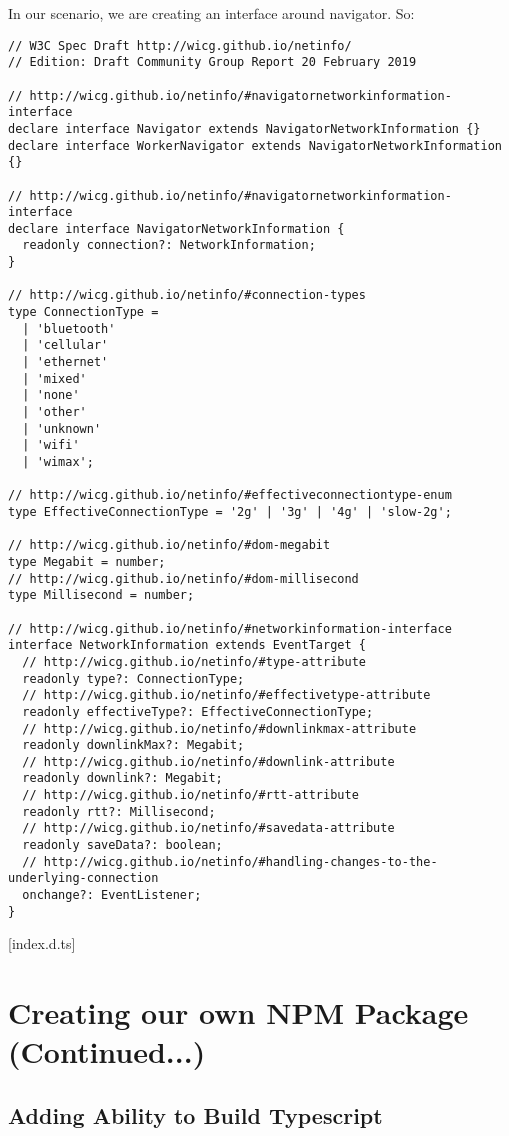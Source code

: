 In our scenario, we are creating an interface around navigator. So: 
\begin{lstlisting}[caption=index.d.ts]
// W3C Spec Draft http://wicg.github.io/netinfo/
// Edition: Draft Community Group Report 20 February 2019

// http://wicg.github.io/netinfo/#navigatornetworkinformation-interface
declare interface Navigator extends NavigatorNetworkInformation {}
declare interface WorkerNavigator extends NavigatorNetworkInformation {}

// http://wicg.github.io/netinfo/#navigatornetworkinformation-interface
declare interface NavigatorNetworkInformation {
  readonly connection?: NetworkInformation;
}

// http://wicg.github.io/netinfo/#connection-types
type ConnectionType =
  | 'bluetooth'
  | 'cellular'
  | 'ethernet'
  | 'mixed'
  | 'none'
  | 'other'
  | 'unknown'
  | 'wifi'
  | 'wimax';

// http://wicg.github.io/netinfo/#effectiveconnectiontype-enum
type EffectiveConnectionType = '2g' | '3g' | '4g' | 'slow-2g';

// http://wicg.github.io/netinfo/#dom-megabit
type Megabit = number;
// http://wicg.github.io/netinfo/#dom-millisecond
type Millisecond = number;

// http://wicg.github.io/netinfo/#networkinformation-interface
interface NetworkInformation extends EventTarget {
  // http://wicg.github.io/netinfo/#type-attribute
  readonly type?: ConnectionType;
  // http://wicg.github.io/netinfo/#effectivetype-attribute
  readonly effectiveType?: EffectiveConnectionType;
  // http://wicg.github.io/netinfo/#downlinkmax-attribute
  readonly downlinkMax?: Megabit;
  // http://wicg.github.io/netinfo/#downlink-attribute
  readonly downlink?: Megabit;
  // http://wicg.github.io/netinfo/#rtt-attribute
  readonly rtt?: Millisecond;
  // http://wicg.github.io/netinfo/#savedata-attribute
  readonly saveData?: boolean;
  // http://wicg.github.io/netinfo/#handling-changes-to-the-underlying-connection
  onchange?: EventListener;
}  
\end{lstlisting}[index.d.ts]

\section{Creating our own NPM Package (Continued...)}
\subsection{Adding Ability to Build Typescript}

